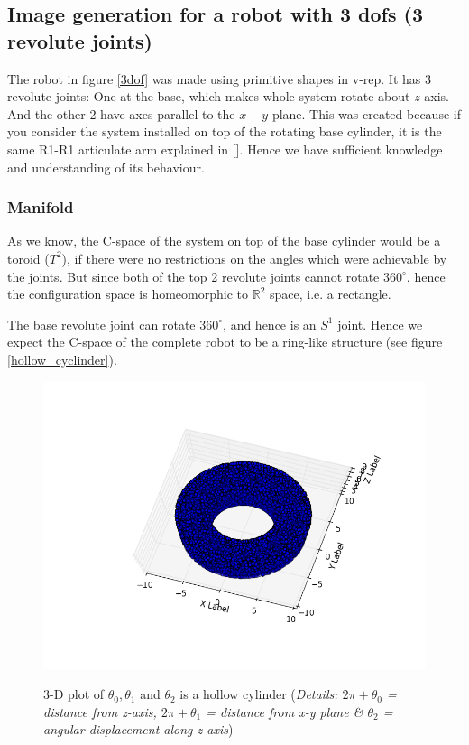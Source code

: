 \documentclass[12pt, two column]{article}
\begin{document}
\subsection{Image generation for a robot with 3 dofs (3 revolute joints)}
\label{3_DOF_robot}

The robot in figure \ref{3dof} was made using primitive shapes in v-rep.
It has 3 revolute joints:
One at the base, which makes whole system rotate about $z$-axis. And the other 2 have axes parallel to the $x-y$ plane.
This was created because if you consider the system installed on top of the rotating base cylinder, it is the same R1-R1 articulate arm explained in [\cite{deb}]. Hence we have sufficient knowledge and understanding of its behaviour.

\subsubsection{Manifold}
  As we know, the C-space of the system on top of the base cylinder would be a toroid ($T^2$), if there were no restrictions on the angles which were achievable by the joints. But since both of the top 2 revolute joints cannot rotate $360^\circ$, hence the configuration space is homeomorphic to $\mathbb{R}^2$ space, i.e. a rectangle.

  The base revolute joint can rotate $360^\circ$, and hence is an $S^1$ joint. Hence we expect the C-space of the complete robot to be a ring-like structure (see figure \ref{hollow_cyclinder}).

  \begin{figure}
  \includegraphics[width=\linewidth]{graphics/hollow_cylinder}
  \label{hollow_cylinder}
  \caption{3-D plot of $\theta_0, \theta_1$ and $\theta_2$ is a hollow cylinder (\textit{Details: $2\pi+\theta_0$ = distance from z-axis, $2\pi+\theta_1$ = distance from x-y plane \& $\theta_2$ = angular displacement along z-axis})}
  \end{figure}
\end{document}
